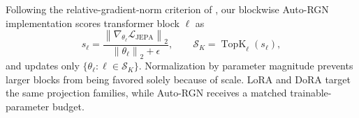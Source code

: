 Following the relative-gradient-norm criterion of \citet{lee2023surgical}, our blockwise Auto-RGN implementation scores transformer block $\ell$ as
\[
s_\ell
=
\frac{
\left\|
\nabla_{\theta_\ell}\mathcal{L}_{\mathrm{JEPA}}
\right\|_2
}{
\left\|\theta_\ell\right\|_2+\epsilon
},
\qquad
\mathcal{S}_K
=
\operatorname{TopK}_{\ell}(s_\ell),
\]
and updates only $\{\theta_\ell:\ell\in\mathcal{S}_K\}$. Normalization by parameter magnitude prevents larger blocks from being favored solely because of scale. LoRA and DoRA target the same projection families, while Auto-RGN receives a matched trainable-parameter budget. 



















































